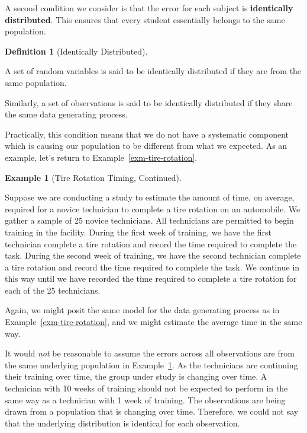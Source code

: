 \documentclass[
  letterpaper,
  DIV=11,
  numbers=noendperiod]{scrreprt}
\theoremstyle{definition}
\newtheorem{definition}{Definition}[chapter]
\theoremstyle{definition}
\newtheorem{example}{Example}[chapter]
\theoremstyle{plain}
\theoremstyle{remark}
\begin{document}
A second condition we consider is that the error for each subject is
\textbf{identically distributed}. This ensures that every student
essentially belongs to the same population.

\begin{definition}[Identically
Distributed]\protect\hypertarget{def-identically-distributed}{}\label{def-identically-distributed}

A set of random variables is said to be identically distributed if they
are from the same population.

Similarly, a set of observations is said to be identically distributed
if they share the same data generating process.

\end{definition}

Practically, this condition means that we do not have a systematic
component which is causing our population to be different from what we
expected. As an example, let's return to
Example~\ref{exm-tire-rotation}.

\begin{example}[Tire Rotation Timing,
Continued]\protect\hypertarget{exm-tire-rotation-alt}{}\label{exm-tire-rotation-alt}

Suppose we are conducting a study to estimate the amount of time, on
average, required for a novice technician to complete a tire rotation on
an automobile. We gather a sample of 25 novice technicians. All
technicians are permitted to begin training in the facility. During the
first week of training, we have the first technician complete a tire
rotation and record the time required to complete the task. During the
second week of training, we have the second technician complete a tire
rotation and record the time required to complete the task. We continue
in this way until we have recorded the time required to complete a tire
rotation for each of the 25 technicians.

Again, we might posit the same model for the data generating process as
in Example~\ref{exm-tire-rotation}, and we might estimate the average
time in the same way.

\end{example}

It would \emph{not} be reasonable to assume the errors across all
observations are from the same underlying population in
Example~\ref{exm-tire-rotation-alt}. As the technicians are continuing
their training over time, the group under study is changing over time. A
technician with 10 weeks of training should not be expected to perform
in the same way as a technician with 1 week of training. The
observations are being drawn from a population that is changing over
time. Therefore, we could not say that the underlying distribution is
identical for each observation.
\end{document}
